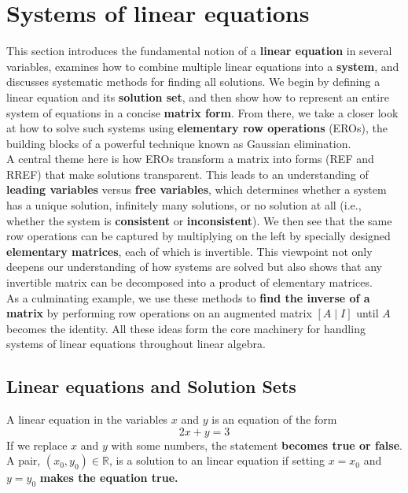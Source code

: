 \documentclass[a4paper, 9pt]{extarticle}
\begin{document}
\section{Systems of linear equations}

This section introduces the fundamental notion of a \textbf{linear equation} in several variables, examines how to combine multiple linear equations into a \textbf{system}, and discusses systematic methods for finding all solutions. We begin by defining a linear equation and its \textbf{solution set}, and then show how to represent an entire system of equations in a concise \textbf{matrix form}. From there, we take a closer look at how to solve such systems using \textbf{elementary row operations} (EROs), the building blocks of a powerful technique known as Gaussian elimination. \\[2ex]
A central theme here is how EROs transform a matrix into forms (REF and RREF) that make solutions transparent. This leads to an understanding of \textbf{leading variables} versus \textbf{free variables}, which determines whether a system has a unique solution, infinitely many solutions, or no solution at all (i.e., whether the system is \textbf{consistent} or \textbf{inconsistent}). We then see that the same row operations can be captured by multiplying on the left by specially designed \textbf{elementary matrices}, each of which is invertible. This viewpoint not only deepens our understanding of how systems are solved but also shows that any invertible matrix can be decomposed into a product of elementary matrices. \\[2ex]
As a culminating example, we use these methods to \textbf{find the inverse of a matrix} by performing row operations on an augmented matrix $[A \mid I]$ until $A$ becomes the identity. All these ideas form the core machinery for handling systems of linear equations throughout linear algebra.

\subsection{Linear equations and Solution Sets}
A linear equation in the variables $x$ and
$y$ is an equation of the form
\begin{equation*}
  2x + y = 3
\end{equation*}
If we replace $x$ and $y$ with some numbers, the statement \textbf{becomes true or false}. \\
A pair, $(x_0, y_0) \in \mathbb{R}$, is a solution to an linear equation if setting $x = x_0$ and $y = y_0$ \textbf{makes the equation true.}
\end{document}
